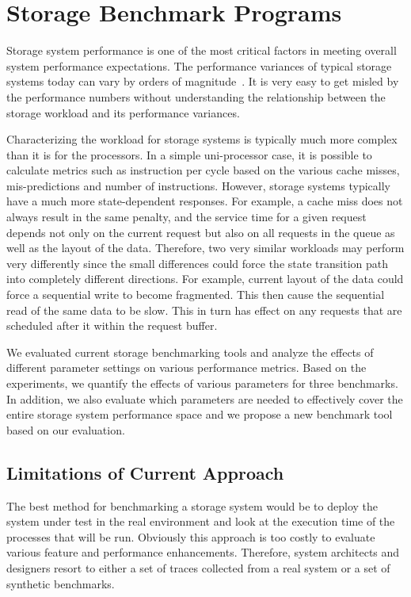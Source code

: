 \chapter{Storage Benchmark Programs}
\label{BENCH}

Storage system performance is one of the most critical factors in meeting overall system performance expectations. 
The performance variances of typical storage systems today can vary by orders of magnitude~\cite{chen:1993}. 
It is very easy to get misled by the performance numbers without understanding the relationship between the storage workload and its performance variances. 

Characterizing the workload for storage systems is typically much more complex than it is for the processors. 
In a simple uni-processor case, it is possible to calculate metrics such as instruction per cycle based on the various cache misses, mis-predictions and number of instructions. 
However, storage systems typically have a much more state-dependent responses. 
For example, a cache miss does not always result in the same penalty, and the service time for a given request depends not only on the  current request but also on all requests in the queue as well as the layout of the data. 
Therefore, two very similar workloads may perform very differently since the small differences could force the state transition path into completely different directions. 
For example, current layout of the data could force a sequential write to become fragmented. 
This then cause the sequential read of the same data to be slow. 
This in turn has effect on any requests that are scheduled after it within the request buffer.

We evaluated current storage benchmarking tools and analyze the effects of different parameter settings on various performance metrics. 
Based on the experiments, we quantify the effects of various parameters for three benchmarks. 
In addition, we also evaluate which parameters are needed to effectively cover the entire storage system performance space and we propose a new benchmark tool based on our evaluation.

\section{Limitations of Current Approach}
The best method for benchmarking a storage system would be to deploy the system under test in the real environment and look at the execution time of the processes that will be run. 
Obviously this approach is too costly to evaluate various feature and performance enhancements. 
Therefore, system architects and designers resort to either a set of traces collected from a real system or a set of synthetic benchmarks.

